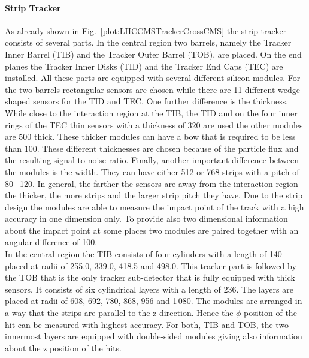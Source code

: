 \paragraph*{Strip Tracker}
As already shown in Fig.~\ref{plot:LHCCMSTrackerCrossCMS} the strip tracker consists of several parts. In the central region two barrels, namely the Tracker Inner Barrel (TIB) and the Tracker Outer Barrel (TOB), are placed. On the end planes the Tracker Inner Disks (TID) and the Tracker End Caps (TEC) are installed. All these parts are equipped with several different silicon modules. For the two barrels rectangular sensors are chosen while there are 11 different wedge-shaped sensors for the TID and TEC. One further difference is the thickness. While close to the interaction region at the TIB, the TID and on the four inner rings of the TEC thin sensors with a thickness of 320\mum{} are used the other modules are 500\mum{} thick. These thicker modules can have a bow that is required to be less than 100\mum{}. These different thicknesses are chosen because of the particle flux and the resulting signal to noise ratio. Finally, another important difference between the modules is the width. They can have either 512 or 768 strips with a pitch of 80$-$120\mum{}. In general, the farther the sensors are away from the interaction region the thicker, the more strips and the larger strip pitch they have. Due to the strip design the modules are able to measure the impact point of the track with a high accuracy in one dimension only. To provide also two dimensional information about the impact point at some places two modules are paired together with an angular difference of 100\mrad{}.\\
In the central region the TIB consists of four cylinders with a length of 140\cm{} placed at radii of 255.0, 339.0, 418.5 and 498.0\mm{}. This tracker part is followed by the TOB that is the only tracker sub-detector that is fully equipped with thick sensors. It consists of six cylindrical layers with a length of 236\cm{}. The layers are placed at radii of 608, 692, 780, 868, 956 and 1\,080\mm{}. The modules are arranged in a way that the strips are parallel to the z direction. Hence the $\phi{}$ position of the hit can be measured with highest accuracy. For both, TIB and TOB, the two innermost layers are equipped with double-sided modules giving also information about the z position of the hits.\\
